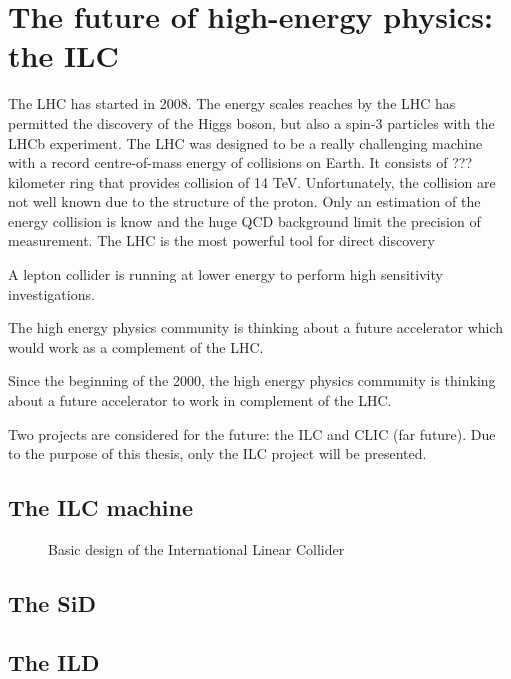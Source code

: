 \chapter{The future of high-energy physics: the ILC}



  The LHC has started in 2008. The energy scales reaches by the LHC has permitted the discovery of the Higgs boson, but also a spin-3 particles with the LHCb experiment.
  The LHC was designed to be a really challenging machine with a record centre-of-mass energy of collisions on Earth.
  It consists of ??? kilometer ring that provides collision of 14 TeV. 
  Unfortunately, the collision are not well known due to the structure of the proton. 
  Only an estimation of the energy collision is know and the huge QCD background limit the precision of measurement.
  The LHC is the most powerful tool for direct discovery

  A lepton collider is running at lower energy to perform high sensitivity investigations.
  
  The high energy physics community is thinking about a future accelerator which would work as a complement of the LHC.


  Since the beginning of the 2000, the high energy physics community is thinking about a future accelerator to work in complement of the LHC.


  Two projects are considered for the future: the ILC and CLIC (far future).
  Due to the purpose of this thesis, only the ILC project will be presented. 
  
  
   
  \section{The ILC machine}

  \begin{figure}
    \centering
    \caption{Basic design of the International Linear Collider}
    \label{fig:ILC}
  \end{figure}
  \section{The SiD}

  \section{The ILD}
